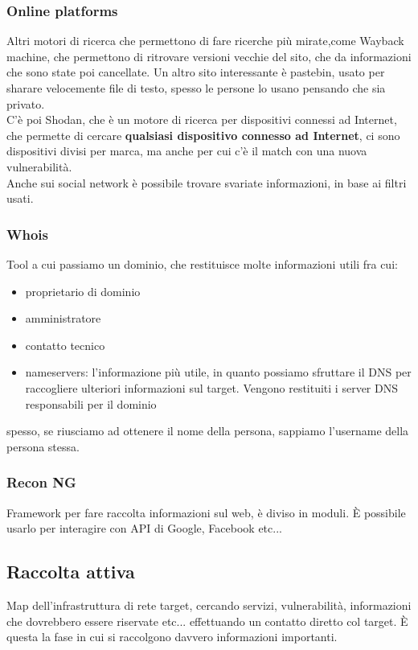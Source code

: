 \documentclass{article}
\begin{document}
\subsubsection{Online platforms}
Altri motori di ricerca che permettono di fare ricerche più mirate,come Wayback machine, che permettono di ritrovare versioni vecchie del sito, che da informazioni che sono state poi cancellate. Un altro sito interessante è pastebin, usato per sharare velocemente file di testo, spesso le persone lo usano pensando che sia privato.\\ C'è poi Shodan, che è un motore di ricerca per dispositivi connessi ad Internet, che permette di cercare \textbf{qualsiasi dispositivo connesso ad Internet}, ci sono dispositivi divisi per marca, ma anche per cui c'è il match con una nuova vulnerabilità.\\ Anche sui social network è possibile trovare svariate informazioni, in base ai filtri usati.
\subsubsection{Whois}
Tool a cui passiamo un dominio, che restituisce molte informazioni utili fra cui:
\begin{itemize}
\item proprietario di dominio
\item amministratore 
\item contatto tecnico
\item nameservers: l'informazione più utile, in quanto possiamo sfruttare il DNS per raccogliere ulteriori informazioni sul target. Vengono restituiti i server DNS responsabili per il dominio
\end{itemize}
spesso, se riusciamo ad ottenere il nome della persona, sappiamo l'username della persona stessa.\\
\subsubsection{Recon NG}
Framework per fare raccolta informazioni sul web, è diviso in moduli. È possibile usarlo per interagire con API di Google, Facebook etc...
\subsection{Raccolta attiva}
Map dell'infrastruttura di rete target, cercando servizi, vulnerabilità, informazioni che dovrebbero essere riservate etc... effettuando un contatto diretto col target. È questa la fase in cui si raccolgono davvero informazioni importanti.
\end{document}
